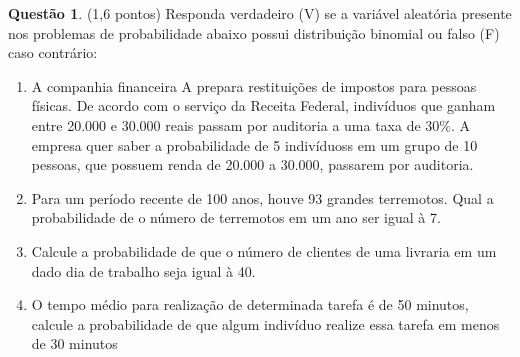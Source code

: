 \documentclass[a4paper,11pt]{article}
\theoremstyle{definition}
\newtheorem{exe}{Questão}
\begin{document}
\medskip
\begin{exe} (1,6 pontos) Responda verdadeiro (V) se a variável aleatória presente nos problemas de probabilidade abaixo possui distribuição binomial ou falso (F) caso contrário:
\begin{enumerate}[1. (\qquad)]
\item A companhia financeira A prepara restituições de impostos para pessoas físicas. De acordo com o serviço
da Receita Federal, indivíduos que ganham entre 20.000 e 30.000 reais passam por auditoria a uma taxa
de $30\%$. A empresa quer saber a probabilidade de 5 indivíduoss em um grupo de 10 pessoas, que possuem
renda de 20.000 a 30.000, passarem por auditoria.
\item Para um período recente de 100 anos, houve 93 grandes terremotos. Qual a probabilidade de o número
de terremotos em um ano ser igual à 7.
\item Calcule a probabilidade de que o número de clientes de uma livraria em um dado dia de trabalho seja
igual à 40.
\item O tempo médio para realização de determinada tarefa é de 50 minutos, calcule a probabilidade de que
algum indivíduo realize essa tarefa em menos de 30 minutos
\end{enumerate}
\end{exe}
\end{document}
